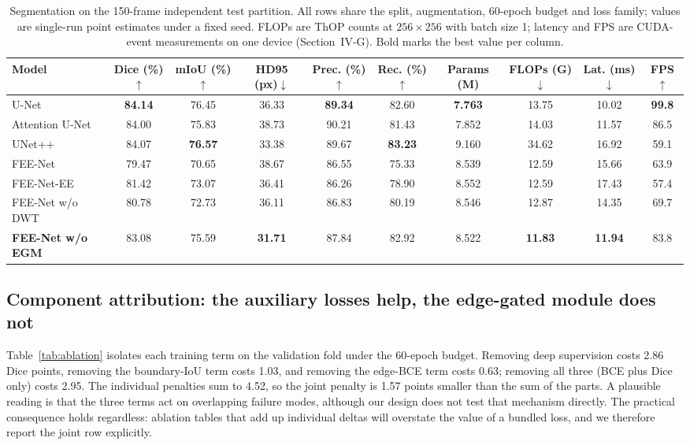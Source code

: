 \documentclass[journal]{IEEEtran}
\begin{document}
\begin{table}[t]
\centering
\caption{Segmentation on the 150-frame independent test partition. All rows share the split, augmentation, 60-epoch budget and loss family; values are single-run point estimates under a fixed seed. FLOPs are ThOP counts at $256\times256$ with batch size 1; latency and FPS are CUDA-event measurements on one device (Section~IV-G). Bold marks the best value per column.}
\label{tab:main}
\begin{tabular}{l|ccc|cc|cccc}
\toprule
\textbf{Model} & \textbf{Dice (\%)}$\uparrow$ & \textbf{mIoU (\%)}$\uparrow$ & \textbf{HD95 (px)}$\downarrow$ & \textbf{Prec. (\%)}$\uparrow$ & \textbf{Rec. (\%)}$\uparrow$ & \textbf{Params (M)} & \textbf{FLOPs (G)}$\downarrow$ & \textbf{Lat. (ms)}$\downarrow$ & \textbf{FPS}$\uparrow$ \\
\midrule
U-Net~\cite{ronneberger2015unet} & \textbf{84.14} & 76.45 & 36.33 & \textbf{89.34} & 82.60 & \textbf{7.763} & 13.75 & 10.02 & \textbf{99.8} \\
Attention U-Net~\cite{oktay2018attention} & 84.00 & 75.83 & 38.73 & 90.21 & 81.43 & 7.852 & 14.03 & 11.57 & 86.5 \\
UNet++~\cite{zhou2018unetpp} & 84.07 & \textbf{76.57} & 33.38 & 89.67 & \textbf{83.23} & 9.160 & 34.62 & 16.92 & 59.1 \\
\midrule
FEE-Net & 79.47 & 70.65 & 38.67 & 86.55 & 75.33 & 8.539 & 12.59 & 15.66 & 63.9 \\
FEE-Net-EE & 81.42 & 73.07 & 36.41 & 86.26 & 78.90 & 8.552 & 12.59 & 17.43 & 57.4 \\
FEE-Net w/o DWT & 80.78 & 72.73 & 36.11 & 86.83 & 80.19 & 8.546 & 12.87 & 14.35 & 69.7 \\
\textbf{FEE-Net w/o EGM} & 83.08 & 75.59 & \textbf{31.71} & 87.84 & 82.92 & 8.522 & \textbf{11.83} & \textbf{11.94} & 83.8 \\
\bottomrule
\end{tabular}
\end{table}

\subsection{Component attribution: the auxiliary losses help, the edge-gated module does not}

Table~\ref{tab:ablation} isolates each training term on the validation fold under the 60-epoch budget. Removing deep supervision costs 2.86 Dice points, removing the boundary-IoU term costs 1.03, and removing the edge-BCE term costs 0.63; removing all three (BCE plus Dice only) costs 2.95. The individual penalties sum to 4.52, so the joint penalty is 1.57 points smaller than the sum of the parts. A plausible reading is that the three terms act on overlapping failure modes, although our design does not test that mechanism directly. The practical consequence holds regardless: ablation tables that add up individual deltas will overstate the value of a bundled loss, and we therefore report the joint row explicitly.
\end{document}
